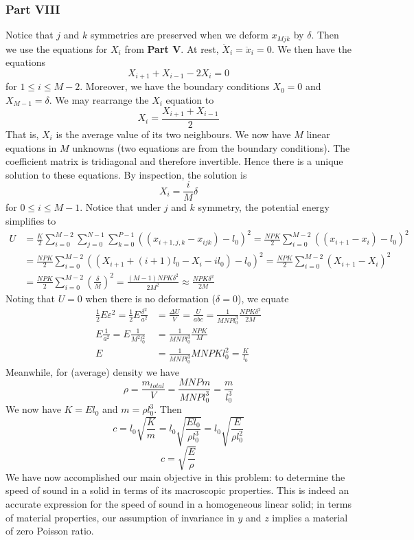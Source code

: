 \documentclass[letterpaper,12pt]{article}
\begin{document}
\begin{flushleft}
    \subsubsection*{Part VIII}
    Notice that $j$ and $k$ symmetries are preserved when we deform $x_{Mjk}$ by $\delta$. Then we use the equations for $X_i$ from \textbf{Part V}. At rest, $\ddot{X}_i = \ddot{x}_i = 0$. We then have the equations
    $$X_{i+1} + X_{i-1} - 2X_i = 0$$
    for $1 \leq i \leq M-2$. Moreover, we have the boundary conditions $X_0 = 0$ and $X_{M-1} = \delta$. We may rearrange the $X_i$ equation to
    $$X_i = \frac{X_{i+1} + X_{i-1}}{2}$$
    That is, $X_i$ is the average value of its two neighbours. We now have $M$ linear equations in $M$ unknowns (two equations are from the boundary conditions). The coefficient matrix is tridiagonal and therefore invertible. Hence there is a unique solution to these equations. By inspection, the solution is
    $$X_i = \frac{i}{M} \delta$$
    for $0 \leq i \leq M-1$. Notice that under $j$ and $k$ symmetry, the potential energy simplifies to
    \begin{align*}
        U &= \frac{K}{2}\sum_{i=0}^{M-2}\sum_{j=0}^{N-1}\sum_{k=0}^{P-1}\left((x_{i+1,j,k} - x_{ijk}) - l_0\right)^2 = \frac{NPK}{2}\sum_{i=0}^{M-2}\left((x_{i+1} - x_{i}) - l_0\right)^2 \\
        &= \frac{NPK}{2}\sum_{i=0}^{M-2}\left((X_{i+1} + (i+1)l_0 - X_{i} - il_0) - l_0\right)^2 = \frac{NPK}{2}\sum_{i=0}^{M-2}\left(X_{i+1} - X_{i}\right)^2 \\
        &= \frac{NPK}{2}\sum_{i=0}^{M-2}\left(\frac{\delta}{M}\right)^2 = \frac{(M-1)NPK\delta^2}{2M^2} \approx \frac{NPK\delta^2}{2M}
    \end{align*}
    Noting that $U = 0$ when there is no deformation ($\delta = 0$), we equate
    \begin{align*}
        \frac{1}{2}E\varepsilon^2 = \frac{1}{2}E\frac{\delta^2}{a^2} &= \frac{\Delta U}{V} = \frac{U}{abc} = \frac{1}{MNPl_0^3} \frac{NPK\delta^2}{2M} \\
        E\frac{1}{a^2} = E\frac{1}{M^2l_0^2} &= \frac{1}{MNPl_0^3} \frac{NPK}{M} \\
        E &= \frac{1}{MNPl_0^3} MNPKl_0^2 = \frac{K}{l_0}
    \end{align*}
    Meanwhile, for (average) density we have
    $$\rho = \frac{m_{total}}{V} = \frac{MNPm}{MNPl_0^3} = \frac{m}{l_0^3}$$
    We now have $K = El_0$ and $m = \rho l_0^3$. Then
    $$c = l_0\sqrt{\frac{K}{m}} = l_0\sqrt{\frac{El_0}{\rho l_0^3}} = l_0\sqrt{\frac{E}{\rho l_0^2}}$$
    $$\boxed{c = \sqrt{\frac{E}{\rho}}}$$
    We have now accomplished our main objective in this problem: to determine the speed of sound in a solid in terms of its macroscopic properties. This is indeed an accurate expression for the speed of sound in a homogeneous linear solid; in terms of material properties, our assumption of invariance in $y$ and $z$ implies a material of zero Poisson ratio.


\end{flushleft}
\end{document}
